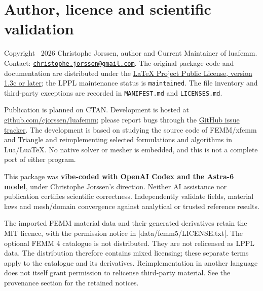 \section*{Author, licence and scientific validation}
Copyright \textcopyright\ 2026 Christophe Jorssen, author and Current Maintainer
of \textsf{luafemm}. Contact:
\href{mailto:christophe.jorssen@gmail.com}{\nolinkurl{christophe.jorssen@gmail.com}}.
The original package code and documentation are distributed under the
\href{https://www.latex-project.org/lppl/lppl-1-3c.txt}{LaTeX Project Public License,
version 1.3c or later}; the LPPL maintenance status is \texttt{maintained}.
The file inventory and third-party exceptions are recorded in
\texttt{MANIFEST.md} and \texttt{LICENSES.md}.

Publication is planned on CTAN. Development is hosted at
\href{https://github.com/cjorssen/luafemm}{github.com/cjorssen/luafemm};
please report bugs through the
\href{https://github.com/cjorssen/luafemm/issues}{GitHub issue tracker}.
The development is based on studying the source code of FEMM/xfemm and
Triangle and reimplementing selected formulations and algorithms in
Lua/LuaTeX. No native solver or mesher is embedded, and this is not a
complete port of either program.

\medskip
\noindent This package was \textbf{vibe-coded with OpenAI Codex and the Astra-6 model},
under Christophe Jorssen's direction. Neither AI assistance nor publication
certifies scientific correctness. Independently validate fields, material laws
and mesh/domain convergence against analytical or trusted reference results.

\medskip
The imported FEMM material data and their generated derivatives retain
the MIT licence, with the permission notice in |data/femm5/LICENSE.txt|.
The optional FEMM 4 catalogue is not distributed.
They are not relicensed as LPPL data. The distribution therefore contains mixed licensing; these separate terms
apply to the catalogue and its derivatives. Reimplementation
in another language does not itself grant permission to relicense
third-party material. See the provenance section for the retained notices.
